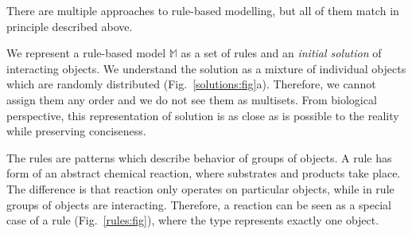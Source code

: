 \documentclass[12pt]{fithesis2}
\begin{document}
There are multiple approaches to rule-based modelling, but all of them match in principle described above.

We represent a rule-based model $\mathds{M}$ as a set of rules and an \emph{initial solution} of interacting objects. We understand the solution as a mixture of individual objects which are randomly distributed (Fig.~\ref{solutions:fig}a). Therefore, we cannot assign them any order and we do not see them as multisets. From biological perspective, this representation of solution is as close as is possible to the reality while preserving conciseness.

The rules are patterns which describe behavior of groups of objects. A rule has form of an abstract chemical reaction, where substrates and products take place. The difference is that reaction only operates on particular objects, while in rule groups of objects are interacting. Therefore, a reaction can be seen as a special case of a rule (Fig.~\ref{rules:fig}), where the type represents exactly one object.
\end{document}
